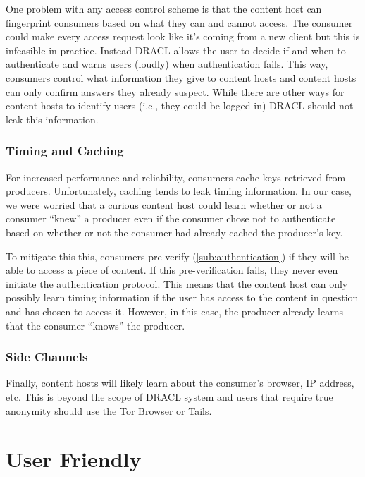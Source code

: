 \documentclass[pdftex,12pt,a4papaer,twoside,notitlepage]{report}
\begin{document}
One problem with any access control scheme is that the content host can
fingerprint consumers based on what they can and cannot access. The consumer
could make every access request look like it's coming from a new client but this
is infeasible in practice. Instead DRACL allows the user to decide if and when
to authenticate and warns users (loudly) when authentication fails. This way,
consumers control what information they give to content hosts and content hosts
can only confirm answers they already suspect. While there are other ways for
content hosts to identify users (i.e., they could be logged in) DRACL should not
leak this information.

\subsubsection{Timing and Caching}
\label{sub:timing}

For increased performance and reliability, consumers cache keys retrieved from
producers. Unfortunately, caching tends to leak timing information. In our
case, we were worried that a curious content host could learn whether or not a
consumer ``knew'' a producer even if the consumer chose not to authenticate
based on whether or not the consumer had already cached the producer's key.

To mitigate this this, consumers pre-verify (\ref{sub:authentication}) if they
will be able to access a piece of content. If this pre-verification fails, they
never even initiate the authentication protocol. This means that the content
host can only possibly learn timing information if the user has access to the
content in question and has chosen to access it. However, in this case, the
producer already learns that the consumer ``knows'' the producer.

\subsubsection{Side Channels}

Finally, content hosts will likely learn about the consumer's browser, IP
address, etc. This is beyond the scope of DRACL system and users that require
true anonymity should use the Tor Browser\cite{tor} or Tails\cite{tails}.

\section{User Friendly}
\label{sec:user_friendly}
\end{document}
